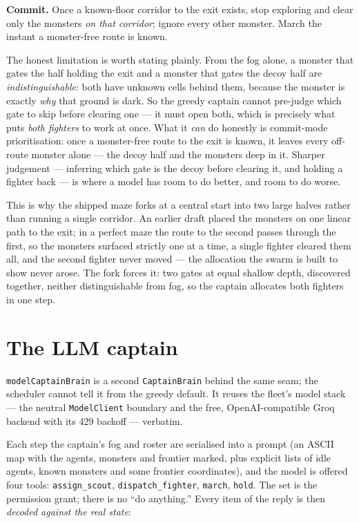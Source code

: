 \documentclass[11pt]{article}
\newcommand{\code}[1]{\texttt{#1}}
\begin{document}
\textbf{Commit.} Once a known-floor corridor to the exit exists, stop exploring and
clear only the monsters \emph{on that corridor}; ignore every other monster. March the
instant a monster-free route is known.

The honest limitation is worth stating plainly. From the fog alone, a monster that
gates the half holding the exit and a monster that gates the decoy half are
\emph{indistinguishable}: both have unknown cells behind them, because the monster is
exactly \emph{why} that ground is dark. So the greedy captain cannot pre-judge which
gate to skip before clearing one --- it must open both, which is precisely what puts
\emph{both fighters} to work at once. What it \emph{can} do honestly is commit-mode
prioritisation: once a monster-free route to the exit is known, it leaves every
off-route monster alone --- the decoy half and the monsters deep in it. Sharper
judgement --- inferring which gate is the decoy before clearing it, and holding a
fighter back --- is where a model has room to do better, and room to do worse.

\medskip\noindent
This is why the shipped maze forks at a central start into two large halves rather
than running a single corridor. An earlier draft placed the monsters on one linear
path to the exit; in a perfect maze the route to the second passes through the first,
so the monsters surfaced strictly one at a time, a single fighter cleared them all, and
the second fighter never moved --- the allocation the swarm is built to show never
arose. The fork forces it: two gates at equal shallow depth, discovered together,
neither distinguishable from fog, so the captain allocates both fighters in one step.

\section{The LLM captain}

\code{modelCaptainBrain} is a second \code{CaptainBrain} behind the same seam; the
scheduler cannot tell it from the greedy default. It reuses the fleet's model stack ---
the neutral \code{ModelClient} boundary and the free, OpenAI-compatible Groq backend
with its 429 backoff --- verbatim.

Each step the captain's fog and roster are serialised into a prompt (an ASCII map with
the agents, monsters and frontier marked, plus explicit lists of idle agents, known
monsters and some frontier coordinates), and the model is offered four tools:
\code{assign\_scout}, \code{dispatch\_fighter}, \code{march}, \code{hold}. The set is
the permission grant; there is no ``do anything.'' Every item of the reply is then
\emph{decoded against the real state}:
\end{document}
